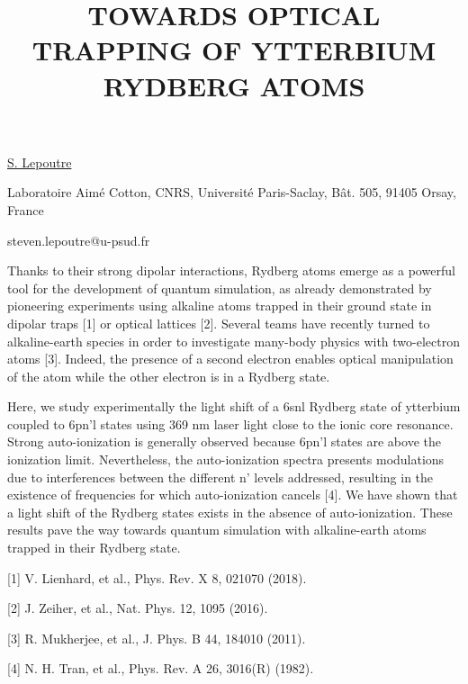 \title{TOWARDS OPTICAL TRAPPING OF YTTERBIUM RYDBERG ATOMS}

\underline{S. Lepoutre}  

{\normalsize{\vspace{-4mm}
Laboratoire Aim\'e Cotton, CNRS, Universit\'e Paris-Saclay, B\^at. 505, 91405 Orsay, France



\email steven.lepoutre@u-psud.fr}}

Thanks to their strong dipolar interactions, Rydberg atoms emerge as a powerful tool for the development of quantum simulation, as already demonstrated by pioneering experiments using alkaline atoms trapped in their ground state in dipolar traps [1] or optical lattices [2]. Several teams have recently turned to alkaline-earth species in order to investigate many-body physics with two-electron atoms [3]. Indeed, the presence of a second electron enables optical manipulation of the atom while the other electron is in a Rydberg state.

Here, we study experimentally the light shift of a 6snl Rydberg state of ytterbium coupled to 6pn’l states using 369 nm laser light close to the ionic core resonance. Strong auto-ionization is generally observed because 6pn’l states are above the ionization limit. Nevertheless, the auto-ionization spectra presents modulations due to interferences between the different n’ levels addressed, resulting in the existence of frequencies for which auto-ionization cancels [4]. We have shown that a light shift of the Rydberg states exists in the absence of auto-ionization. These results pave the way towards quantum simulation with alkaline-earth atoms trapped in their Rydberg state.

{\normalsize
[1] V. Lienhard, et al., Phys. Rev. X 8, 021070 (2018).
\vsp

[2] J. Zeiher, et al., Nat. Phys. 12, 1095 (2016).
\vsp

[3] R. Mukherjee, et al., J. Phys. B 44, 184010 (2011).
\vsp

[4] N. H. Tran, et al., Phys. Rev. A 26, 3016(R) (1982).
}


\vspace{\baselineskip}